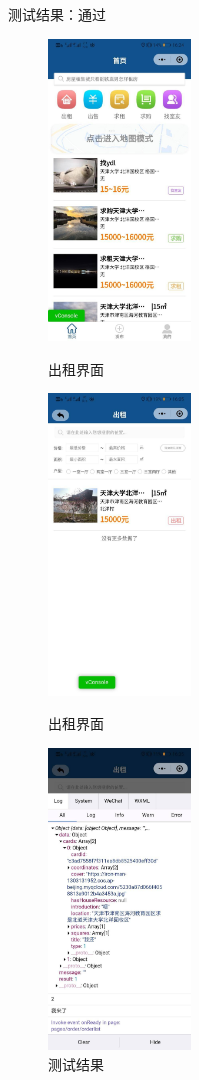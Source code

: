 测试结果：通过
\newpage

\begin{figure}[htbp]
    \centering
    \begin{minipage}[t]{0.32\textwidth}
        \centering
        \includegraphics[width=3.8cm,height=8cm]{test/image/test8.png} 
       \caption{出租界面} 
        \end{minipage}
    \begin{minipage}[t]{0.32\textwidth}
    \centering
    \includegraphics[width=3.8cm,height=8cm]{test/image/test9.png} 
   \caption{出租界面} 
    \end{minipage}
    \begin{minipage}[t]{0.32\textwidth}
    \centering
    \includegraphics[width=3.8cm,height=8cm]{test/image/test10.png}
    \caption{测试结果}
    \end{minipage}
    \end{figure}

